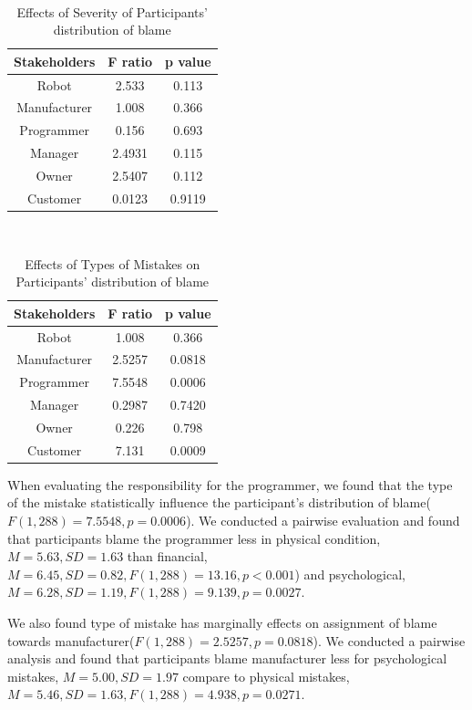 \documentclass{sigchi}
\begin{document}
\hspace{1 mm} \\
\begin{table}[h]
  \centering
  \begin{tabular}{ccc}
    Stakeholders & F ratio & p value\\
    \hline
    Robot & 2.533 & 0.113\\
    Manufacturer & 1.008 & 0.366\\
    Programmer & 0.156 & 0.693 \\
    Manager & 2.4931 & 0.115 \\
    Owner & 2.5407 & 0.112 \\
    Customer & 0.0123 & 0.9119 \\
    \hline
  \end{tabular}
  \caption{Effects of Severity of Participants' distribution of blame}
  \label{tab:table2}
\end{table}

\hspace{1 mm} \\
\begin{table}[h]
  \centering
  \begin{tabular}{ccc}
    Stakeholders & F ratio & p value\\
    \hline
    Robot & 1.008 & 0.366\\
    Manufacturer & 2.5257 & 0.0818\\
    Programmer & 7.5548 & 0.0006 \\
    Manager & 0.2987 & 0.7420 \\
    Owner & 0.226 & 0.798 \\
    Customer & 7.131 & 0.0009 \\
    \hline
  \end{tabular}
  \caption{Effects of Types of Mistakes on Participants' distribution of blame}
  \label{tab:table2}
\end{table}


When evaluating the responsibility for the programmer, we found that the type of the mistake statistically influence the participant's distribution of blame($F(1,288)=7.5548, p = 0.0006$). We conducted a pairwise evaluation and found that participants blame the programmer less in physical condition, $M=5.63, SD=1.63$ than financial, $M=6.45, SD=0.82, F(1,288)=13.16, p < 0.001$) and psychological, $M=6.28, SD=1.19, F(1,288)=9.139, p = 0.0027$.

We also found type of mistake has marginally effects on assignment of blame towards manufacturer($F(1,288)=2.5257, p = 0.0818$). We conducted a pairwise analysis and found that participants blame manufacturer less for psychological mistakes, $M=5.00, SD=1.97$ compare to physical mistakes, $M=5.46, SD=1.63, F(1,288)=4.938, p=0.0271$.
\end{document}
